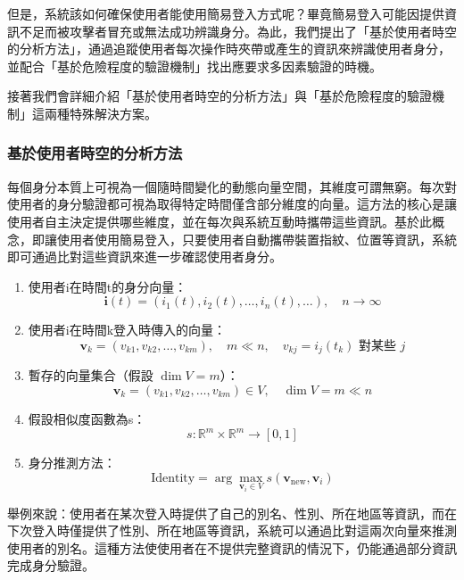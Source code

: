但是，系統該如何確保使用者能使用簡易登入方式呢？畢竟簡易登入可能因提供資訊不足而被攻擊者冒充或無法成功辨識身分。為此，我們提出了「基於使用者時空的分析方法」，通過追蹤使用者每次操作時夾帶或產生的資訊來辨識使用者身分，並配合「基於危險程度的驗證機制」找出應要求多因素驗證的時機。

接著我們會詳細介紹「基於使用者時空的分析方法」與「基於危險程度的驗證機制」這兩種特殊解決方案。
\subsubsection{基於使用者時空的分析方法}
每個身分本質上可視為一個隨時間變化的動態向量空間，其維度可謂無窮。每次對使用者的身分驗證都可視為取得特定時間僅含部分維度的向量。這方法的核心是讓使用者自主決定提供哪些維度，並在每次與系統互動時攜帶這些資訊。基於此概念，即讓使用者使用簡易登入，只要使用者自動攜帶裝置指紋、位置等資訊，系統即可通過比對這些資訊來進一步確認使用者身分。
\begin{enumerate}
  \item 使用者i在時間t的身分向量：
        \begin{equation}
          \mathbf{i}(t) = (i_1(t), i_2(t), \ldots, i_n(t), \ldots), \quad n \to \infty
        \end{equation}
  \item 使用者i在時間k登入時傳入的向量：
        \begin{equation}
          \mathbf{v}_k = (v_{k1}, v_{k2}, \ldots, v_{km}), \quad m \ll n, \quad v_{kj} = i_j(t_k) \text{ 對某些 } j
        \end{equation}
  \item 暫存的向量集合（假設 $\dim V = m$）：
        \begin{equation}
          \mathbf{v}_k = (v_{k1}, v_{k2}, \ldots, v_{km}) \in V, \quad \dim V = m \ll n
        \end{equation}
  \item 假設相似度函數為s：
        \begin{equation}
          s: \mathbb{R}^m \times \mathbb{R}^m \to [0, 1]
        \end{equation}
  \item 身分推測方法：
        \begin{equation}
          \text{Identity} = \arg\max_{\mathbf{v}_i \in V} s(\mathbf{v}_{\text{new}}, \mathbf{v}_i)
        \end{equation}
\end{enumerate}
舉例來說：使用者在某次登入時提供了自己的別名、性別、所在地區等資訊，而在下次登入時僅提供了性別、所在地區等資訊，系統可以通過比對這兩次向量來推測使用者的別名。這種方法使使用者在不提供完整資訊的情況下，仍能通過部分資訊完成身分驗證。

